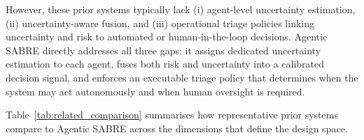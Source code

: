 \documentclass[lettersize,journal]{IEEEtran}
\begin{document}
However, these prior systems typically lack (i) agent-level uncertainty
estimation, (ii) uncertainty-aware fusion, and (iii) operational triage policies linking uncertainty and risk to automated or human-in-the-loop decisions. Agentic SABRE directly addresses all three gaps: it assigns dedicated uncertainty estimation to each agent, fuses both risk and uncertainty into a calibrated decision signal, and enforces an executable triage policy that determines when the system may act autonomously and when human oversight is required.

Table~\ref{tab:related_comparison} summarises how representative prior systems compare to
Agentic SABRE across the dimensions that define the design space.

\begin{table}[t]
\centering
\caption{Comparison of Agentic SABRE with representative prior ransomware and intrusion
detection systems across key design dimensions. \checkmark~= present; $\circ$~= partial;
$\times$~= absent.}
\label{tab:related_comparison}
\end{table}
\end{document}
